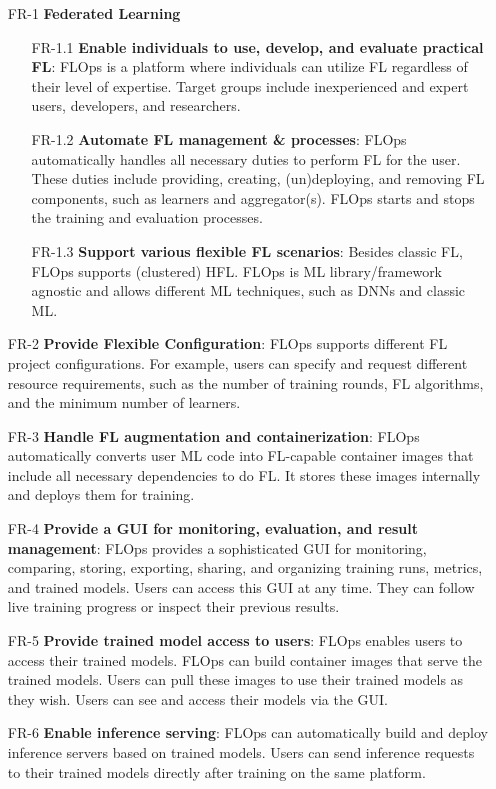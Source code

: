 \begin{itemize}
    \item [FR-1] {\textbf{Federated Learning}}
        \begin{itemize}
        \item [FR-1.1] \textbf{Enable individuals to use, develop, and evaluate practical FL}:
            FLOps is a platform where individuals can utilize FL regardless of their level of expertise.
            Target groups include inexperienced and expert users, developers, and researchers.
        \item [FR-1.2] \textbf{Automate FL management \& processes}:
            FLOps automatically handles all necessary duties to perform FL for the user.
            These duties include providing, creating, (un)deploying, and removing FL components, such as learners and aggregator(s).
            FLOps starts and stops the training and evaluation processes.
        \item [FR-1.3] \textbf{Support various flexible FL scenarios}:
            Besides classic FL, FLOps supports (clustered) HFL.
            FLOps is ML library/framework agnostic and allows different ML techniques, such as DNNs and classic ML.
        \end{itemize}
    \item [FR-2] {\textbf{Provide Flexible Configuration}}:
        FLOps supports different FL project configurations.
        For example, users can specify and request different resource requirements, such as the number of training rounds, FL algorithms, and the minimum number of learners.
    \item [FR-3] {\textbf{Handle FL augmentation and containerization}}:
        FLOps automatically converts user ML code into FL-capable container images that include all necessary dependencies to do FL.
        It stores these images internally and deploys them for training.
    \item [FR-4] {\textbf{Provide a GUI for monitoring, evaluation, and result management}}:
        FLOps provides a sophisticated GUI for monitoring, comparing, storing, exporting, sharing, and organizing training runs, metrics, and trained models.
        Users can access this GUI at any time.
        They can follow live training progress or inspect their previous results.
    \item [FR-5] {\textbf{Provide trained model access to users}}:
        FLOps enables users to access their trained models.
        FLOps can build container images that serve the trained models.
        Users can pull these images to use their trained models as they wish.
        Users can see and access their models via the GUI.
    \item [FR-6] {\textbf{Enable inference serving}}:
        FLOps can automatically build and deploy inference servers based on trained models.
        Users can send inference requests to their trained models directly after training on the same platform.
\end{itemize}

